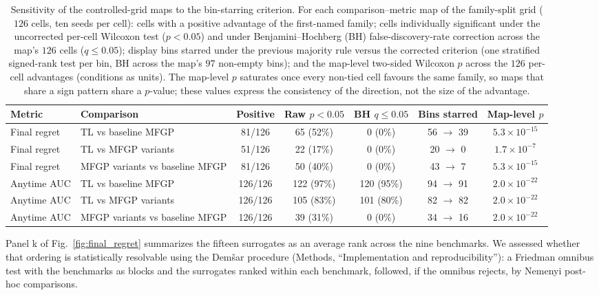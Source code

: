 \documentclass[11pt,a4paper]{article}%
\begin{document}
\begin{table}[h]
\centering
\caption{Sensitivity of the controlled-grid maps to the bin-starring criterion. For
each comparison--metric map of the family-split grid ($126$ cells, ten seeds per
cell): cells with a positive advantage of the first-named family; cells individually
significant under the uncorrected per-cell Wilcoxon test ($p<0.05$) and under
Benjamini--Hochberg (BH) false-discovery-rate correction across the map's $126$
cells ($q\le0.05$); display bins starred under the previous majority rule versus the
corrected criterion (one stratified signed-rank test per bin, BH across the map's
$97$ non-empty bins); and the map-level two-sided Wilcoxon $p$ across the $126$
per-cell advantages (conditions as units). The map-level $p$ saturates once every
non-tied cell favours the same family, so maps that share a sign pattern share a
$p$-value; these values express the consistency of the direction, not the size of the
advantage.}
\label{supptab:star_sensitivity}%
\begin{tabular}{@{}llccccc@{}}
\toprule
Metric & Comparison & Positive & Raw $p<0.05$ & BH $q\le0.05$ & Bins starred & Map-level $p$ \\
\midrule
Final regret & TL vs baseline MFGP & 81/126 & 65 (52\%) & 0 (0\%) & 56 $\to$ 39 & $5.3\times10^{-15}$ \\
Final regret & TL vs MFGP variants & 51/126 & 22 (17\%) & 0 (0\%) & 20 $\to$ 0 & $1.7\times10^{-7}$ \\
Final regret & MFGP variants vs baseline MFGP & 81/126 & 50 (40\%) & 0 (0\%) & 43 $\to$ 7 & $5.3\times10^{-15}$ \\
\midrule
Anytime AUC & TL vs baseline MFGP & 126/126 & 122 (97\%) & 120 (95\%) & 94 $\to$ 91 & $2.0\times10^{-22}$ \\
Anytime AUC & TL vs MFGP variants & 126/126 & 105 (83\%) & 101 (80\%) & 82 $\to$ 82 & $2.0\times10^{-22}$ \\
Anytime AUC & MFGP variants vs baseline MFGP & 126/126 & 39 (31\%) & 0 (0\%) & 34 $\to$ 16 & $2.0\times10^{-22}$ \\
\bottomrule
\end{tabular}
\end{table}


Panel k of Fig.~\ref{fig:final_regret} summarizes the fifteen surrogates as an average
rank across the nine benchmarks. We assessed whether that ordering is statistically
resolvable using the Dem\v{s}ar procedure (Methods, ``Implementation and
reproducibility''): a Friedman omnibus test with the benchmarks as blocks and the
surrogates ranked within each benchmark, followed, if the omnibus rejects, by Nemenyi
post-hoc comparisons.
\end{document}
